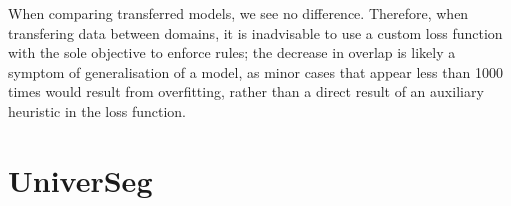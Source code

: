 \documentclass[11pt,twoside]{report}
\begin{document}
When comparing transferred models, we see no difference. Therefore, when transfering data between domains, it is inadvisable to use a custom loss function with the sole objective to enforce rules; the decrease in overlap is likely a symptom of generalisation of a model, as minor cases that appear less than 1000 times would result from overfitting, rather than a direct result of an auxiliary heuristic in the loss function. 


\clearpage

\section{UniverSeg}






\end{document}
